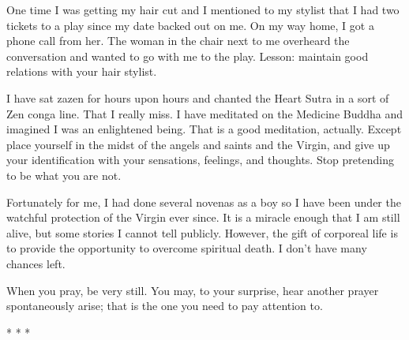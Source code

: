 One time I was getting my hair cut and I mentioned to my stylist that I had two tickets to a play since my date backed out on me. On my way home, I got a phone call from her. The woman in the chair next to me overheard the conversation and wanted to go with me to the play. Lesson: maintain good relations with your hair stylist.

I have sat zazen for hours upon hours and chanted the Heart Sutra in a sort of Zen conga line. That I really miss. I have meditated on the Medicine Buddha and imagined I was an enlightened being. That is a good meditation, actually. Except place yourself in the midst of the angels and saints and the Virgin, and give up your identification with your sensations, feelings, and thoughts. Stop pretending to be what you are not.

Fortunately for me, I had done several novenas as a boy so I have been under the watchful protection of the Virgin ever since. It is a miracle enough that I am still alive, but some stories I cannot tell publicly. However, the gift of corporeal life is to provide the opportunity to overcome spiritual death. I don't have many chances left.

When you pray, be very still. You may, to your surprise, hear another prayer spontaneously arise; that is the one you need to pay attention to.




\begin{center}* * *\end{center}

